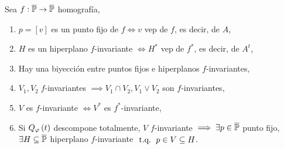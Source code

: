 \begin{prop}
	Sea $f : \overline{\mathbb{P}} \to \overline{\mathbb{P}}$ homografía,
	\begin{enumerate}[(1)]
		\item \label{item:1_homografias} $p = [v]$ es un punto fijo de $f \iff v$ vep de $f$, es decir, de $A$,
		\item \label{item:2_homografias} $H$ es un hiperplano $f$-invariante $\iff H^*$ vep de $f^*$, es decir, de $A^t$,
		\item Hay una biyección entre puntos fijos e hiperplanos $f$-invariantes,
		\item $V_1, V_2\; f$-invariantes $\implies V_1 \cap V_2, V_1 \vee V_2$ son $f$-invariantes,
		\item \label{item:5_homografias} $V$ es $f$-invariante $\iff V^*$ es $f^*$-invariante,
		\item Si $Q_\varphi \left( t\right)$ descompone totalmente, $V$ $f$-invariante $\implies \exists p\in \overline{\mathbb{P}}$ punto fijo, $\exists H\subseteq\overline{\mathbb{P}}$ hiperplano $f$-invariante $\operatorname{\text{ t.q. }} p \in V \subseteq H$.
	\end{enumerate}
\end{prop}
